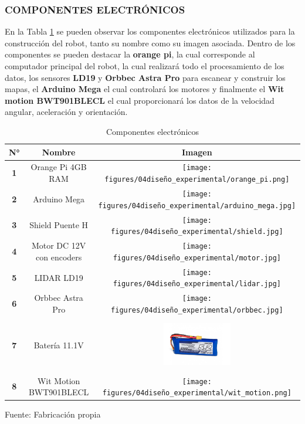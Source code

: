 \subsubsection{COMPONENTES ELECTRÓNICOS}
En la Tabla \ref{tab:componentes_electronicos} se pueden observar los componentes electrónicos utilizados para la construcción del robot, tanto su nombre como su imagen asociada. Dentro de los componentes se pueden destacar la \textbf{orange pi}, la cual corresponde al computador principal del robot, la cual realizará todo el procesamiento de los datos, los sensores \textbf{LD19} y \textbf{Orbbec Astra Pro} para escanear y construir los mapas, el \textbf{Arduino Mega} el cual controlará los motores y finalmente el \textbf{Wit motion BWT901BLECL} el cual proporcionará los datos de la velocidad angular, aceleración y orientación.
\begin{table}[H]
    \centering
    \begin{tabular}{|c|c|c|}
    \hline
    \textbf{N°} & \textbf{Nombre}  & \textbf{Imagen} \\ \hline
    \hline
    \textbf{1}  & Orange Pi 4GB RAM  & \texttt{[image: figures/04diseño\_experimental/orange\_pi.png]} 
    \\ \hline
    \textbf{2}  & Arduino Mega     &  \texttt{[image: figures/04diseño\_experimental/arduino\_mega.jpg]}
    \\ \hline
    \textbf{3}  & Shield Puente H  & \texttt{[image: figures/04diseño\_experimental/shield.jpg]}    
    \\ \hline
    \textbf{4}  & Motor DC 12V con encoders    &  \texttt{[image: figures/04diseño\_experimental/motor.jpg]}    
    \\ \hline
    \textbf{5}  & LIDAR LD19       &   \texttt{[image: figures/04diseño\_experimental/lidar.jpg]}       \\ \hline
    \textbf{6}  & Orbbec Astra Pro &  
    \texttt{[image: figures/04diseño\_experimental/orbbec.jpg]} 
    \\ \hline
    \textbf{7}  & Batería 11.1V    & 
    \includegraphics[width=3cm, height=2.3cm]{figures/04diseño_experimental/batería.jpg} 
    \\ \hline
    \textbf{8}  & Wit Motion BWT901BLECL    & 
    \texttt{[image: figures/04diseño\_experimental/wit\_motion.png]} 
    \\ \hline
    \end{tabular}
    \caption{Componentes electrónicos} Fuente: Fabricación propia
\label{tab:componentes_electronicos}
\end{table}

